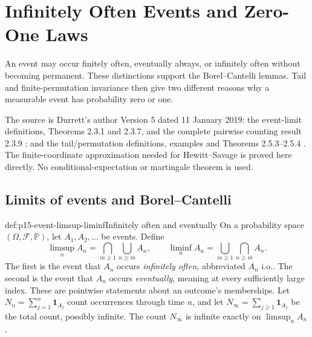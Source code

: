 \chapter{Infinitely Often Events and Zero-One Laws}
\label{sec:p15-limsup-events-and-zero-one-laws}

An event may occur finitely often, eventually always, or infinitely often
without becoming permanent. These distinctions support the Borel--Cantelli
lemmas. Tail and finite-permutation invariance then give two different
reasons why a measurable event has probability zero or one.

The source is Durrett's author Version 5 dated 11 January 2019:
the event-limit definitions, Theorems 2.3.1 and 2.3.7, and the complete
pairwise counting result 2.3.9 \cite[pp.~67--72]{DurrettPTEAuthor2019};
and the tail/permutation definitions, examples and Theorems 2.5.3--2.5.4
\cite[pp.~81--83]{DurrettPTEAuthor2019}. The finite-coordinate
approximation needed for Hewitt--Savage is proved here directly.
No conditional-expectation or martingale theorem is used.

\section{Limits of events and Borel--Cantelli}
\label{sec:p15-event-limits}

\begin{hbdefinition}{def:p15-event-limsup-liminf}{Infinitely often and eventually}
On a probability space \((\Omega,\mathcal F,\mathbb P)\), let
\(A_1,A_2,\ldots\) be events. Define
\[
 \limsup_n A_n=\bigcap_{m\geq1}\bigcup_{n\geq m}A_n,
 \qquad
 \liminf_n A_n=\bigcup_{m\geq1}\bigcap_{n\geq m}A_n.
\]
The first is the event that \(A_n\) occurs \emph{infinitely often},
abbreviated \(A_n\text{ i.o.}\). The second is the event that
\(A_n\) occurs \emph{eventually}, meaning at every sufficiently
large index. These are pointwise statements about an outcome's memberships.
Let \(N_n=\sum_{j=1}^n\mathbf1_{A_j}\) count occurrences through
time \(n\), and let \(N_\infty=\sum_{j\geq1}\mathbf1_{A_j}\)
be the total count, possibly infinite. The count \(N_\infty\) is
infinite exactly on \(\limsup_n A_n\).
\end{hbdefinition}

